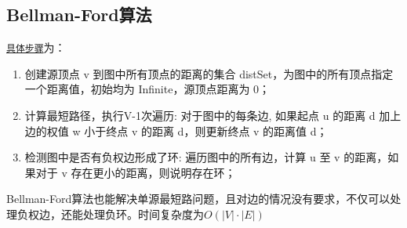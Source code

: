 \subsection{Bellman-Ford算法}
\href{http://www.cnblogs.com/gaochundong/p/bellman_ford_algorithm.html}{\texttt{具体步骤}}为：
\begin{enumerate}
	\item 创建源顶点 v 到图中所有顶点的距离的集合 distSet，为图中的所有顶点指定一个距离值，初始均为 Infinite，源顶点距离为 0；
	\item 计算最短路径，执行V-1次遍历: 对于图中的每条边, 如果起点 u 的距离 d 加上边的权值 w 小于终点 v 的距离 d，则更新终点 v 的距离值 d；
	\item 检测图中是否有负权边形成了环: 遍历图中的所有边，计算 u 至 v 的距离，如果对于 v 存在更小的距离，则说明存在环；
\end{enumerate}

Bellman-Ford算法也能解决单源最短路问题，且对边的情况没有要求，不仅可以处理负权边，还能处理负环。时间复杂度为$O(|V|\cdot |E|)$

